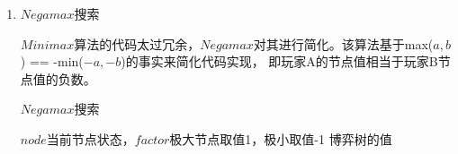 \documentclass[10pt,letterpaper]{ctexart}
\begin{document}
\begin{enumerate}[itemindent=2.5em,label=\arabic*、]
    \item $Negamax$搜索
    \par \qquad $Minimax$算法的代码太过冗余，$Negamax$对其进行简化。该算法基于max($a,b$) == -min($-a, -b$)的事实来简化代码实现，
    即玩家A的节点值相当于玩家B节点值的负数。
    \begin{algorithm}
      \caption{$Negamax$搜索}
        \begin{algorithmic}[1] %
          \Require $node$当前节点状态，$factor$极大节点取值1，极小取值-1
          \Ensure 博弈树的值
              \State {}
            \Else
              \EndFor
              \State {}
            \EndIf
            \EndFunction
        \end{algorithmic}
    \end{algorithm}


\end{enumerate}
\end{document}
